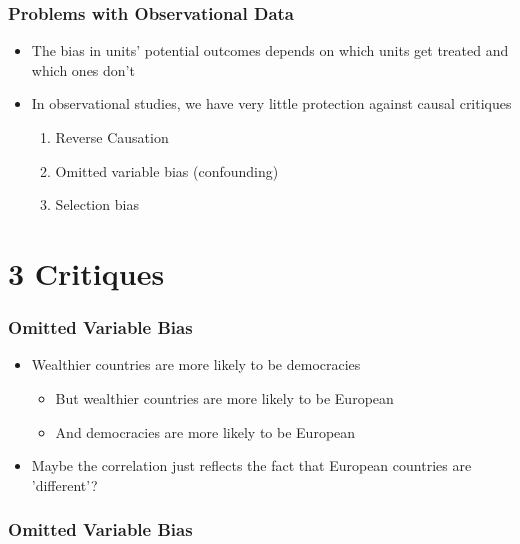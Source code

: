 \documentclass[xcolor=x11names,compress]{beamer}\usepackage[]{graphicx}\usepackage[]{color}
\makeatletter
\newenvironment{kframe}{%
 \def\at@end@of@kframe{}%
 \ifinner\ifhmode%
  \def\at@end@of@kframe{\end{minipage}}%
  \begin{minipage}{\columnwidth}%
 \fi\fi%
 \def\FrameCommand##1{\hskip\@totalleftmargin \hskip-\fboxsep
 \colorbox{shadecolor}{##1}\hskip-\fboxsep
     \hskip-\linewidth \hskip-\@totalleftmargin \hskip\columnwidth}%
 \MakeFramed {\advance\hsize-\width
   \@totalleftmargin\z@ \linewidth\hsize
   \@setminipage}}%
 {\par\unskip\endMakeFramed%
 \at@end@of@kframe}
\newenvironment{knitrout}{}{} %
\renewcommand{\(}{\begin{columns}}
\renewcommand{\)}{\end{columns}}
\newcommand{\<}[1]{\begin{column}{#1}}
\renewcommand{\>}{\end{column}}
\makeatother
\begin{document}
\begin{frame}
\frametitle{Problems with Observational Data}
\begin{itemize}
\item The bias in units' potential outcomes depends on which units get treated and which ones don't
\item In observational studies, we have very little protection against causal critiques
\begin{enumerate}
\item Reverse Causation
\item Omitted variable bias (confounding)
\item Selection bias
\end{enumerate}
\end{itemize}
\end{frame}

\section{3 Critiques}

\begin{frame}
\frametitle{Omitted Variable Bias}
\begin{itemize}
\item Wealthier countries are more likely to be democracies
\begin{itemize}
\item But wealthier countries are more likely to be European
\item And democracies are more likely to be European
\end{itemize}
\item Maybe the correlation just reflects the fact that European countries are 'different'?
\end{itemize}
\end{frame}

\begin{frame}
\frametitle{Omitted Variable Bias}
\begin{knitrout}
\color{fgcolor}\begin{kframe}


{\ttfamily\noindent\bfseries{}}

{\ttfamily\noindent\bfseries{}}\end{kframe}
\end{knitrout}
\end{frame}
\end{document}
